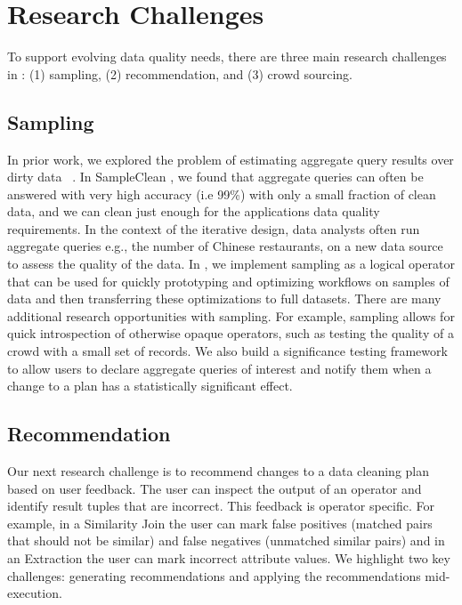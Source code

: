 \section{Research Challenges}
To support evolving data quality needs, there are three main research challenges in \sys: (1) sampling, (2) recommendation, and (3) crowd sourcing.

\subsection{Sampling}
In prior work, we explored the problem of estimating aggregate query results over dirty data ~\cite{wang1999sample}.
In SampleClean \cite{wang1999sample}, we found that aggregate queries can often be answered with very high accuracy (i.e 99\%) with only a small fraction of clean data, and we can clean just enough for the applications data quality requirements.
In the context of the iterative design, data analysts often run aggregate queries e.g., the number of Chinese restaurants, on a new data source to assess the quality of the data.
In \sys, we implement sampling as a logical operator that can be used for quickly prototyping and optimizing workflows on samples of data and then transferring these optimizations to full datasets.
There are many additional research opportunities with sampling.
For example, sampling allows for quick introspection of otherwise opaque operators, such as testing the quality of a crowd with a small set of records.
We also build a significance testing framework to allow users to declare aggregate queries of interest and notify them when a change to 
a plan has a statistically significant effect.

\subsection{Recommendation}
Our next research challenge is to recommend changes to a data cleaning plan based on user feedback. 
The user can inspect the output of an operator and identify result tuples that are incorrect. This feedback is operator specific. For example, in a Similarity Join the user can mark false positives (matched pairs that should not be similar) and false negatives (unmatched similar pairs) and in an Extraction the user can mark incorrect attribute values. 
We highlight two key challenges: generating recommendations and applying the recommendations mid-execution.

\vspace{.25em}


